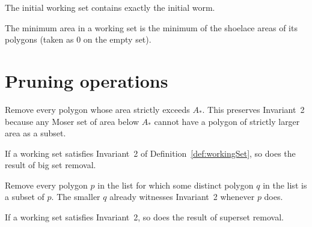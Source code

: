 \begin{definition}
  \label{def:initialWorkingSet}
  \leanok
  The initial working set contains exactly the initial worm.
\end{definition}

\begin{definition}
  \label{def:minArea}
  \leanok
  The minimum area in a working set is the minimum of the shoelace areas
  of its polygons (taken as $0$ on the empty set).
\end{definition}

\section{Pruning operations}

\begin{definition}
  \label{def:bigSetRemoval}
  \leanok
  Remove every polygon whose area strictly exceeds $A_*$. This preserves
  Invariant~2 because any Moser set of area below $A_*$ cannot have a
  polygon of strictly larger area as a subset.
\end{definition}

\begin{proposition}
  \label{prop:bigSetRemoval-correct}
  If a working set satisfies Invariant~2 of
  Definition~\ref{def:workingSet}, so does the result of big set removal.
\end{proposition}

\begin{definition}
  \label{def:supersetRemoval}
  \leanok
  Remove every polygon $p$ in the list for which some distinct polygon
  $q$ in the list is a subset of $p$. The smaller $q$ already witnesses
  Invariant~2 whenever $p$ does.
\end{definition}

\begin{proposition}
  \label{prop:supersetRemoval-correct}
  If a working set satisfies Invariant~2, so does the result of superset
  removal.
\end{proposition}


